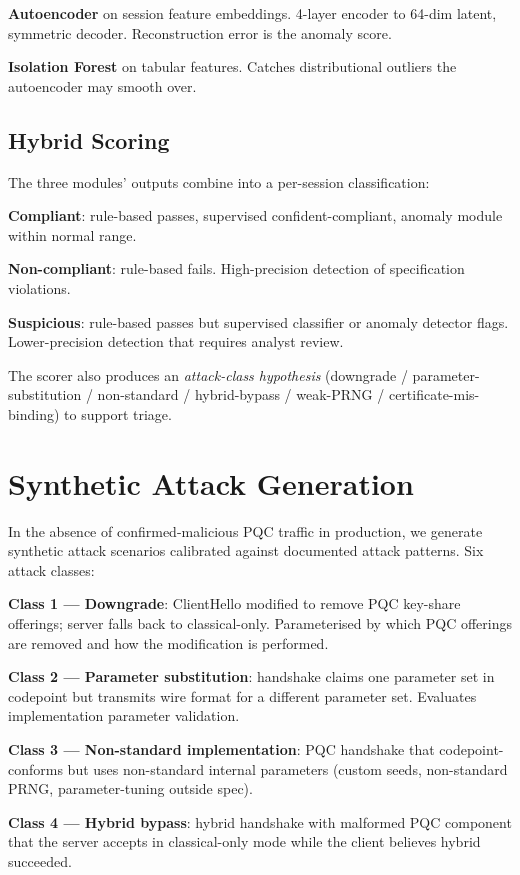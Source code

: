 \documentclass[sigconf,nonacm]{acmart}
\begin{document}
\textbf{Autoencoder} on session feature embeddings. 4-layer encoder
to 64-dim latent, symmetric decoder. Reconstruction error is the
anomaly score.

\textbf{Isolation Forest} on tabular features. Catches
distributional outliers the autoencoder may smooth over.

\subsection{Hybrid Scoring}

The three modules' outputs combine into a per-session
classification:

\textbf{Compliant}: rule-based passes, supervised confident-compliant,
anomaly module within normal range.

\textbf{Non-compliant}: rule-based fails. High-precision detection
of specification violations.

\textbf{Suspicious}: rule-based passes but supervised classifier
or anomaly detector flags. Lower-precision detection that requires
analyst review.

The scorer also produces an \textit{attack-class hypothesis}
(downgrade / parameter-substitution / non-standard / hybrid-bypass /
weak-PRNG / certificate-mis-binding) to support triage.

\section{Synthetic Attack Generation}

In the absence of confirmed-malicious PQC traffic in production, we
generate synthetic attack scenarios calibrated against documented
attack patterns. Six attack classes:

\textbf{Class 1 --- Downgrade}: ClientHello modified to remove PQC
key-share offerings; server falls back to classical-only.
Parameterised by which PQC offerings are removed and how the
modification is performed.

\textbf{Class 2 --- Parameter substitution}: handshake claims one
parameter set in codepoint but transmits wire format for a different
parameter set. Evaluates implementation parameter validation.

\textbf{Class 3 --- Non-standard implementation}: PQC handshake
that codepoint-conforms but uses non-standard internal parameters
(custom seeds, non-standard PRNG, parameter-tuning outside spec).

\textbf{Class 4 --- Hybrid bypass}: hybrid handshake with malformed
PQC component that the server accepts in classical-only mode while
the client believes hybrid succeeded.
\end{document}
